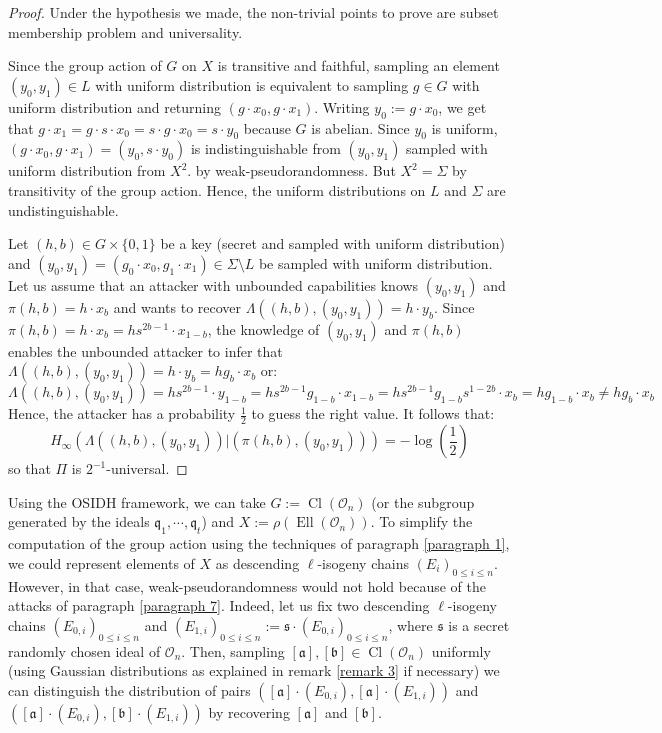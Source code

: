 \documentclass[a4paper,10pt]{report}
\theoremstyle{definition}
\theoremstyle{plain}
\theoremstyle{definition}
\newcommand{\mO}{\mathcal{O}}
\renewcommand{\(}{\left(}
\renewcommand{\)}{\right)}
\newcommand{\mf}[1]{\mathfrak{#1}}
\DeclareMathOperator{\Cl}{Cl}
\DeclareMathOperator{\Ell}{Ell}
\begin{document}
\begin{proof}
Under the hypothesis we made, the non-trivial points to prove are subset membership problem and universality.  

Since the group action of $G$ on $X$ is transitive and faithful, sampling an element $(y_0,y_1)\in L$ with uniform distribution is equivalent to sampling $g\in G$ with uniform distribution and returning $(g\cdot x_0, g\cdot x_1)$. Writing $y_0:=g\cdot x_0$, we get that $g\cdot x_1=g\cdot s\cdot x_0=s\cdot g\cdot x_0=s\cdot y_0$ because $G$ is abelian. Since $y_0$ is uniform, $(g\cdot x_0, g\cdot x_1)=(y_0,s\cdot y_0)$ is indistinguishable from $(y_0,y_1)$ sampled with uniform distribution from $X^2$. by weak-pseudorandomness. But $X^2=\Sigma$ by transitivity of the group action. Hence, the uniform distributions on $L$ and $\Sigma$ are undistinguishable.

Let $(h,b)\in G\times\{0,1\}$ be a key (secret and sampled with uniform distribution) and $(y_0,y_1)=(g_0\cdot x_0, g_1\cdot x_1)\in \Sigma\setminus L$ be sampled with uniform distribution. Let us assume that an attacker with unbounded capabilities knows $(y_0,y_1)$ and $\pi(h,b)=h\cdot x_b$ and wants to recover $\Lambda((h,b),(y_0,y_1))=h\cdot y_b$. Since $\pi(h,b)=h\cdot x_b=hs^{2b-1}\cdot x_{1-b}$, the knowledge of $(y_0,y_1)$ and $\pi(h,b)$ enables the unbounded attacker to infer that $\Lambda((h,b),(y_0,y_1))=h\cdot y_b=hg_b\cdot x_b$ or:
\[\Lambda((h,b),(y_0,y_1))=hs^{2b-1}\cdot y_{1-b}=hs^{2b-1}g_{1-b}\cdot x_{1-b}=hs^{2b-1}g_{1-b}s^{1-2b}\cdot x_b=hg_{1-b}\cdot x_b\neq hg_b\cdot x_b\]
Hence, the attacker has a probability $\frac{1}{2}$ to guess the right value. It follows that:
\[H_\infty(\Lambda((h,b),(y_0,y_1))|(\pi(h,b),(y_0,y_1)))=-\log\(\frac{1}{2}\)\]
so that $\Pi$ is $2^{-1}$-universal.
\end{proof}

Using the OSIDH framework, we can take $G:=\Cl(\mO_n)$ (or the subgroup generated by the ideals $\mf{q}_1, \cdots, \mf{q}_t$) and $X:=\rho(\Ell(\mO_n))$. To simplify the computation of the group action using the techniques of paragraph \ref{paragraph 1}, we could represent elements of $X$ as descending $\ell$-isogeny chains $(E_i)_{0\leq i\leq n}$. However, in that case, weak-pseudorandomness would not hold because of the attacks of paragraph \ref{paragraph 7}.  Indeed, let us fix two descending $\ell$-isogeny chains $(E_{0,i})_{0\leq i\leq n}$ and $(E_{1,i})_{0\leq i\leq n}:=\mf{s}\cdot (E_{0,i})_{0\leq i\leq n}$, where $\mf{s}$ is a secret randomly chosen ideal of $\mO_n$. Then, sampling $[\mf{a}],[\mf{b}]\in\Cl(\mO_n)$ uniformly (using Gaussian distributions as explained in remark \ref{remark 3} if necessary) we can distinguish the distribution of pairs $([\mf{a}]\cdot(E_{0,i}),[\mf{a}]\cdot(E_{1,i}))$ and $([\mf{a}]\cdot(E_{0,i}),[\mf{b}]\cdot(E_{1,i}))$ by recovering $[\mf{a}]$ and $[\mf{b}]$. 
\end{document}

